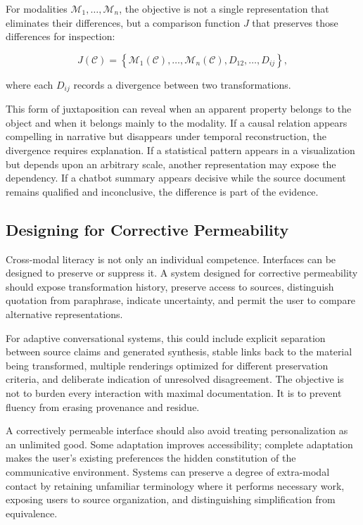 \documentclass[11pt]{article}
\newcommand{\modality}{\mathcal{M}}
\newcommand{\contentobj}{\mathcal{C}}
\begin{document}
For modalities \(\modality_1,\ldots,\modality_n\), the objective is not a
single representation that eliminates their differences, but a comparison
function \(J\) that preserves those differences for inspection:

\begin{equation}
  J(\contentobj)
  =
  \left\{
    \modality_1(\contentobj),
    \ldots,
    \modality_n(\contentobj),
    D_{12},
    \ldots,
    D_{ij}
  \right\},
  \label{eq:modal-juxtaposition}
\end{equation}

where each \(D_{ij}\) records a divergence between two transformations.

This form of juxtaposition can reveal when an apparent property belongs to the
object and when it belongs mainly to the modality. If a causal relation
appears compelling in narrative but disappears under temporal reconstruction,
the divergence requires explanation. If a statistical pattern appears in a
visualization but depends upon an arbitrary scale, another representation may
expose the dependency. If a chatbot summary appears decisive while the source
document remains qualified and inconclusive, the difference is part of the
evidence.

\subsection{Designing for Corrective Permeability}

Cross-modal literacy is not only an individual competence. Interfaces can be
designed to preserve or suppress it. A system designed for corrective
permeability should expose transformation history, preserve access to sources,
distinguish quotation from paraphrase, indicate uncertainty, and permit the
user to compare alternative representations.

For adaptive conversational systems, this could include explicit separation
between source claims and generated synthesis, stable links back to the
material being transformed, multiple renderings optimized for different
preservation criteria, and deliberate indication of unresolved disagreement.
The objective is not to burden every interaction with maximal documentation.
It is to prevent fluency from erasing provenance and residue.

A correctively permeable interface should also avoid treating personalization
as an unlimited good. Some adaptation improves accessibility; complete
adaptation makes the user's existing preferences the hidden constitution of
the communicative environment. Systems can preserve a degree of extra-modal
contact by retaining unfamiliar terminology where it performs necessary work,
exposing users to source organization, and distinguishing simplification from
equivalence.
\end{document}
